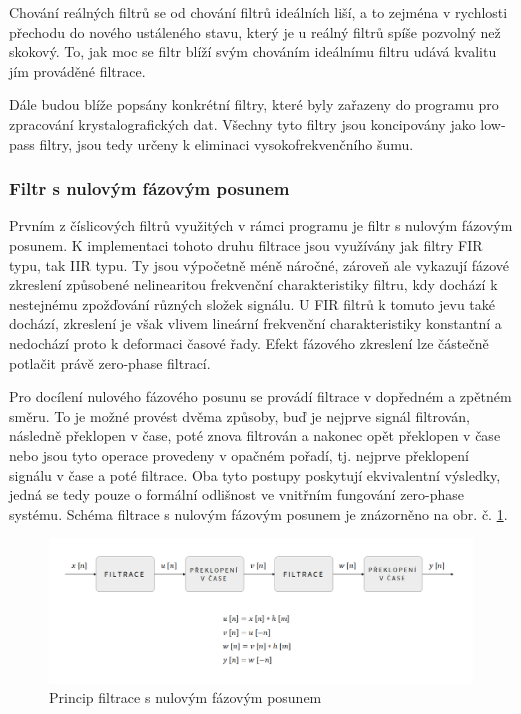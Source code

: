 \documentclass[a4paper, 12pt]{article}
\begin{document}
\textcolor{cdorange}{Chování reálných filtrů se od chování filtrů ideálních liší, a to zejména v rychlosti přechodu do nového ustáleného stavu, který je u reálný filtrů spíše pozvolný než skokový. To, jak moc se filtr blíží svým chováním ideálnímu filtru udává kvalitu jím prováděné filtrace.}

Dále budou blíže popsány konkrétní filtry, které byly zařazeny do programu pro zpracování krystalografických dat. Všechny tyto filtry jsou koncipovány jako low-pass filtry, jsou tedy určeny k eliminaci vysokofrekvenčního šumu.

\subsubsection{Filtr s nulovým fázovým posunem}
\label{sec:filtr1}
Prvním z číslicových filtrů využitých v rámci programu je filtr s nulovým fázovým posunem. K implementaci tohoto druhu filtrace jsou využívány jak filtry FIR typu, tak IIR typu. Ty jsou výpočetně méně náročné, zároveň ale vykazují fázové zkreslení způsobené nelinearitou frekvenční charakteristiky filtru, kdy dochází k nestejnému zpožďování různých složek signálu. U FIR filtrů k tomuto jevu také dochází, zkreslení je však vlivem lineární frekvenční charakteristiky konstantní a nedochází proto k deformaci časové řady. Efekt fázového zkreslení lze částečně potlačit právě zero-phase filtrací. 

Pro docílení nulového fázového posunu se provádí filtrace v dopředném a zpětném směru. To je možné provést dvěma způsoby, buď je nejprve signál filtrován, následně překlopen v čase, poté znova filtrován a nakonec opět překlopen v čase nebo jsou tyto operace provedeny v opačném pořadí, tj. nejprve překlopení signálu v čase a poté filtrace. Oba tyto postupy poskytují ekvivalentní výsledky, jedná se tedy pouze o formální odlišnost ve vnitřním fungování zero-phase systému. Schéma filtrace s nulovým fázovým posunem je znázorněno na obr. č. \ref{fig:zerophase}.
\begin{figure}[hbt!]
  \centering
  \includegraphics[width=\linewidth]{zero-phase_moje.png}
  \caption{Princip filtrace s nulovým fázovým posunem}
  \label{fig:zerophase}
\end{figure}
\end{document}

